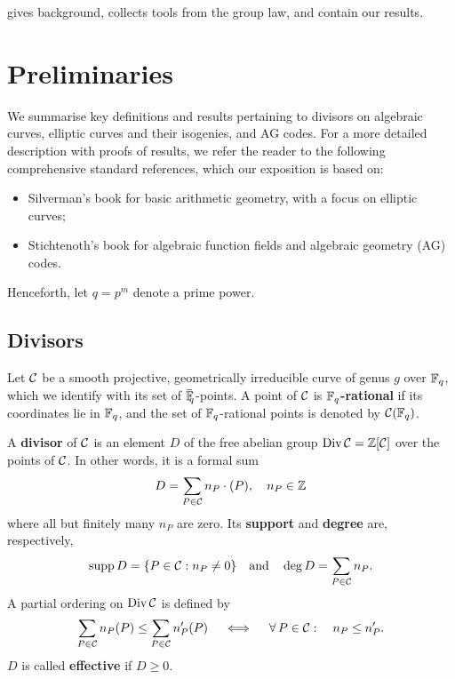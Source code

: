 \documentclass[twocolumn, 11pt]{scrartcl}
\begin{document}
 gives background,  collects tools from the group law, and  contain our results.

\section{Preliminaries} \label{section:preliminaries}

We summarise key definitions and results pertaining to divisors on algebraic curves, elliptic curves and their isogenies, and AG codes. For a more detailed description with proofs of results, we refer the reader to the following comprehensive standard references, which our exposition is based on:
\begin{itemize}
    \item Silverman's book \cite{silverman2009arithmetic} for basic arithmetic geometry, with a focus on elliptic curves;
    \item Stichtenoth's book \cite{stichtenoth2009algebraic} for algebraic function fields and algebraic geometry (AG) codes.
\end{itemize}
Henceforth, let $q=p^m$ denote a prime power.

\subsection{Divisors} \label{section:divisors}

Let $\mathcal{C}$ be a smooth projective, geometrically irreducible curve of genus $g$ over $\mathbb{F}_q$, which we identify with its set of $\Fbar{q}$-points. A point of $\mathcal{C}$ is \textbf{$\mathbb{F}_q$-rational} if its coordinates lie in $\mathbb{F}_q$, and the set of $\mathbb{F}_q$-rational points is denoted by $\mathcal{C}(\mathbb{F}_q)$.

A \textbf{divisor} of $\mathcal{C}$ is an element $D$ of the free abelian group $\operatorname{Div}\mathcal{C}=\mathbb{Z}[\mathcal{C}]$ over the points of $\mathcal{C}$. In other words, it is a formal sum
\[ D=\sum_{P\in\mathcal{C}} n_P\cdot(P),\quad n_P\in\mathbb{Z} \]
where all but finitely many $n_P$ are zero. Its \textbf{support} and \textbf{degree} are, respectively,
\[ \operatorname{supp} D=\{P\in\mathcal{C}:n_P\neq0\} \quad\text{and}\quad \deg D=\sum_{P\in\mathcal{C}} n_P. \]
A partial ordering on $\operatorname{Div}\mathcal{C}$ is defined by
\[ \sum_{P\in\mcC} n_P(P)\leq\sum_{P\in\mcC} n'_P(P) \qiff \forall P\in\mcC:\quad n_P\leq n'_P. \]
$D$ is called \textbf{effective} if $D\geq 0$.
\end{document}
